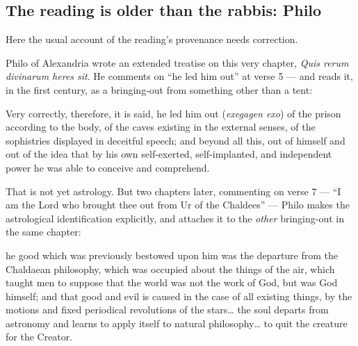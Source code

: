 \subsection{The reading is older than the rabbis: Philo}

Here the usual account of the reading's provenance needs correction.

Philo of Alexandria wrote an extended treatise on this very chapter,
\textit{Quis rerum divinarum heres sit}. He comments on ``he led him out'' at
verse 5 --- and reads it, in the first century, as a bringing-out from something
other than a tent:

\begin{studyframe}
Very correctly, therefore, it is said, he led him out (\textit{exegagen exo}) of
the prison according to the body, of the caves existing in the external senses,
of the sophistries displayed in deceitful speech; and beyond all this, out of
himself and out of the idea that by his own self-exerted, self-implanted, and
independent power he was able to conceive and comprehend.
\end{studyframe}

That is not yet astrology. But two chapters later, commenting on verse 7 ---
``I am the Lord who brought thee out from Ur of the Chaldees'' --- Philo makes
the astrological identification explicitly, and attaches it to the \emph{other}
bringing-out in the same chapter:

\begin{studyframe}
[T]he good which was previously bestowed upon him was the departure from the
Chaldaean philosophy, which was occupied about the things of the air, which
taught men to suppose that the world was not the work of God, but was God
himself; and that good and evil is caused in the case of all existing things, by
the motions and fixed periodical revolutions of the stars\dots{} the soul departs
from astronomy and learns to apply itself to natural philosophy\dots{} to quit
the creature for the Creator.
\end{studyframe}

